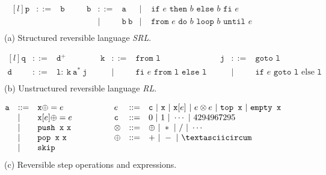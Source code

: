 \begin{figure}[ht]

  \begin{minipage}{\textwidth}
    \center
    $$\begin{matrix*}[l]
      \mathtt{p} & ::= & \mathtt{b} & \quad & \mathtt{b} & ::= & \mathtt{a}             & | & \texttt{ if }e\texttt{ then }b\texttt{ else }b\texttt{ fi }e\\
                 &     &           &        &            &  |  & \mathtt{b}\ \mathtt{b} & | & \texttt{ from }e\texttt{ do }b\texttt{ loop }b\texttt{ until }e\\
    \end{matrix*}$$
    (a) Structured reversible language \textit{SRL}.
  \end{minipage}

  \begin{minipage}{\textwidth}
    \center
    $$\begin{matrix*}[l]
      \mathtt{q} & ::= & \mathtt{d}^+                                      & & \mathtt{k} & ::= & \texttt{from }\mathtt{l} & & \mathtt{j} & ::= & \texttt{goto }\mathtt{l}\\
      \mathtt{d} & ::= & \mathtt{l}:\ \mathtt{k}\ \mathtt{a}^*\ \mathtt{j} &       &            &  |  & \texttt{fi }e\texttt{ from }\mathtt{l}\texttt{ else }\mathtt{l} &
        & & | & \texttt{if }e\texttt{ goto }\mathtt{l}\text{ else }\mathtt{l}\\
    \end{matrix*}$$
    (b) Unstructured reversible language \textit{RL}.
  \end{minipage}

  \begin{minipage}{\textwidth}
    \center
    $$\begin{matrix*}[l]
      \mathtt{a} & ::= & \mathtt{x}\oplus= e & \quad\quad\quad &  e & ::= & \mathtt{c} \ | \ \mathtt{x} \ | \ \mathtt{x}[ e] \ | \  e\otimes e \ | \ \texttt{top }\mathtt{x} \ | \ \texttt{empty }\mathtt{x}\\
                 &  |  & \mathtt{x}[ e]\oplus= e &     & \mathtt{c} & ::= & 0\ | \ 1\ |\ \cdots\ |\ 4294967295\\
                 &  |  & \texttt{push }\mathtt{x}\ \mathtt{x}      &     & \otimes    & ::= & \oplus \ | \ * \ | \ / \ | \ \cdots\\
                 &  |  & \texttt{pop  }\mathtt{x}\ \mathtt{x}      &     & \oplus     & ::= & +  \ | \  -  \ | \  \textasciicircum\\
                 &  |  & \texttt{skip}\\
    \end{matrix*}$$
    (c) Reversible step operations and expressions.
  \end{minipage}


\end{figure}
